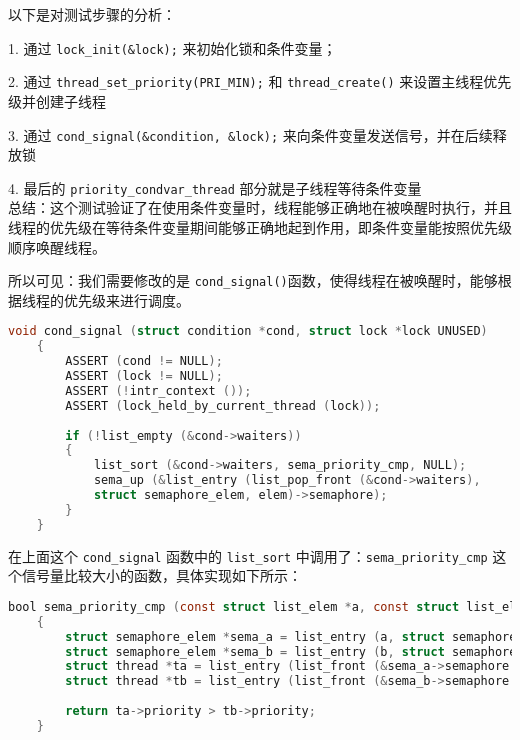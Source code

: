 \documentclass{article}
\begin{document}
	以下是对测试步骤的分析：
	
	1. 通过 \texttt{lock\_init(\&lock);} 来初始化锁和条件变量；
	
	2. 通过 \texttt{thread\_set\_priority(PRI\_MIN);} 和 \texttt{thread\_create()} 来设置主线程优先级并创建子线程
	
	3. 通过 \texttt{cond\_signal(\&condition, \&lock);} 来向条件变量发送信号，并在后续释放锁
	
	4. 最后的 \texttt{priority\_condvar\_thread} 部分就是子线程等待条件变量\\[1em]
	
	总结：这个测试验证了在使用条件变量时，线程能够正确地在被唤醒时执行，并且线程的优先级在等待条件变量期间能够正确地起到作用，即条件变量能按照优先级顺序唤醒线程。
	
	所以可见：我们需要修改的是 \texttt{cond\_signal()}函数，使得线程在被唤醒时，能够根据线程的优先级来进行调度。
	
	\begin{lstlisting}[language=C, title=修改后的\texttt{cond\_signal()}函数]
    void cond_signal (struct condition *cond, struct lock *lock UNUSED) 
    {
    	ASSERT (cond != NULL);
    	ASSERT (lock != NULL);
    	ASSERT (!intr_context ());
    	ASSERT (lock_held_by_current_thread (lock));
    	
    	if (!list_empty (&cond->waiters)) 
    	{
    		list_sort (&cond->waiters, sema_priority_cmp, NULL);
    		sema_up (&list_entry (list_pop_front (&cond->waiters),
    		struct semaphore_elem, elem)->semaphore);
    	}
    }
	\end{lstlisting}
	
	在上面这个 \texttt{cond\_signal} 函数中的 \texttt{list\_sort} 中调用了：\texttt{sema\_priority\_cmp} 这个信号量比较大小的函数，具体实现如下所示：
	
	\begin{lstlisting}[language=C, title=信号量比较函数]
    bool sema_priority_cmp (const struct list_elem *a, const struct list_elem *b, void *aux UNUSED)
    {
    	struct semaphore_elem *sema_a = list_entry (a, struct semaphore_elem, elem);
    	struct semaphore_elem *sema_b = list_entry (b, struct semaphore_elem, elem);
    	struct thread *ta = list_entry (list_front (&sema_a->semaphore.waiters), struct thread, elem);
    	struct thread *tb = list_entry (list_front (&sema_b->semaphore.waiters), struct thread, elem);
    	
    	return ta->priority > tb->priority;
    }
	\end{lstlisting}
	
\end{document}
